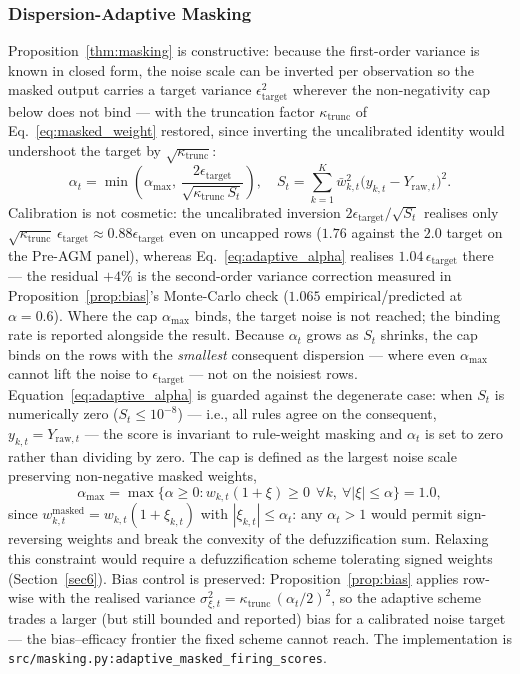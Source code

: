 \documentclass[pdflatex,sn-mathphys-num]{sn-jnl}
\theoremstyle{thmstyleone}
\theoremstyle{thmstyletwo}
\theoremstyle{thmstylethree}
\begin{document}
\subsubsection{Dispersion-Adaptive Masking}\label{subsubsec3_4_2}
Proposition~\ref{thm:masking} is constructive: because the first-order variance is known in closed form, the noise scale can be inverted per observation so the masked output carries a target variance $\epsilon_{\mathrm{target}}^2$ wherever the non-negativity cap below does not bind --- with the truncation factor $\kappa_{\mathrm{trunc}}$ of Eq.~\eqref{eq:masked_weight} restored, since inverting the uncalibrated identity would undershoot the target by $\sqrt{\kappa_{\mathrm{trunc}}}$:
\begin{equation}
    \alpha_t = \min\!\left(\alpha_{\max},\, \frac{2\epsilon_{\mathrm{target}}}{\sqrt{\kappa_{\mathrm{trunc}}\,S_t}}\right), \quad S_t = \sum_{k=1}^{K} \bar{w}_{k,t}^2 \bigl(y_{k,t} - Y_{\mathrm{raw},t}\bigr)^2.
    \label{eq:adaptive_alpha}
\end{equation}
Calibration is not cosmetic: the uncalibrated inversion $2\epsilon_{\mathrm{target}}/\sqrt{S_t}$ realises only $\sqrt{\kappa_{\mathrm{trunc}}}\,\epsilon_{\mathrm{target}} \approx 0.88\epsilon_{\mathrm{target}}$ even on uncapped rows ($1.76$ against the $2.0$ target on the Pre-AGM panel), whereas Eq.~\eqref{eq:adaptive_alpha} realises $1.04\,\epsilon_{\mathrm{target}}$ there --- the residual $+4\%$ is the second-order variance correction measured in Proposition~\ref{prop:bias}'s Monte-Carlo check ($1.065$ empirical/predicted at $\alpha = 0.6$). Where the cap $\alpha_{\max}$ binds, the target noise is not reached; the binding rate is reported alongside the result. Because $\alpha_t$ grows as $S_t$ shrinks, the cap binds on the rows with the \emph{smallest} consequent dispersion --- where even $\alpha_{\max}$ cannot lift the noise to $\epsilon_{\mathrm{target}}$ --- not on the noisiest rows. Equation~\eqref{eq:adaptive_alpha} is guarded against the degenerate case: when $S_t$ is numerically zero ($S_t \le 10^{-8}$) --- i.e., all rules agree on the consequent, $y_{k,t} = Y_{\mathrm{raw},t}$ --- the score is invariant to rule-weight masking and $\alpha_t$ is set to zero rather than dividing by zero. The cap is defined as the largest noise scale preserving non-negative masked weights,
\begin{equation}
    \alpha_{\max} = \max\bigl\{\alpha \ge 0 : w_{k,t}(1+\xi) \ge 0 \ \ \forall k,\ \forall |\xi| \le \alpha\bigr\} = 1.0,
    \label{eq:alpha_max}
\end{equation}
since $w_{k,t}^{\text{masked}} = w_{k,t}(1 + \xi_{k,t})$ with $|\xi_{k,t}| \le \alpha_t$: any $\alpha_t > 1$ would permit sign-reversing weights and break the convexity of the defuzzification sum. Relaxing this constraint would require a defuzzification scheme tolerating signed weights (Section~\ref{sec6}). Bias control is preserved: Proposition~\ref{prop:bias} applies row-wise with the realised variance $\sigma_{\xi,t}^2 = \kappa_{\mathrm{trunc}}\,(\alpha_t/2)^2$, so the adaptive scheme trades a larger (but still bounded and reported) bias for a calibrated noise target --- the bias--efficacy frontier the fixed scheme cannot reach. The implementation is \texttt{src/masking.py:adaptive\_masked\_firing\_scores}.
\end{document}
